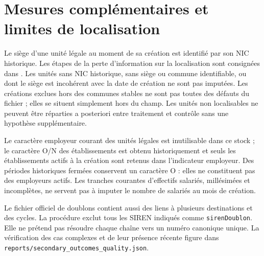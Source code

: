 \section{Mesures complémentaires et limites de localisation}
Le siège d’une unité légale au moment de sa création est identifié par son NIC historique. Les étapes de la perte d’information sur la localisation sont consignées dans . Les unités sans NIC historique, sans siège ou commune identifiable, ou dont le siège est incohérent avec la date de création ne sont pas imputées. Les créations exclues hors des communes stables ne sont pas toutes des défauts du fichier ; elles se situent simplement hors du champ. Les unités non localisables ne peuvent être réparties a posteriori entre traitement et contrôle sans une hypothèse supplémentaire.

Le caractère employeur courant des unités légales est inutilisable dans ce stock ; le caractère O/N des établissements est obtenu historiquement et seuls les établissements actifs à la création sont retenus dans l’indicateur employeur. Des périodes historiques fermées conservent un caractère O : elles ne constituent pas des employeurs actifs. Les tranches courantes d’effectifs salariés, millésimées et incomplètes, ne servent pas à imputer le nombre de salariés au mois de création.

Le fichier officiel de doublons contient aussi des liens à plusieurs destinations et des cycles. La procédure exclut tous les SIREN indiqués comme \texttt{sirenDoublon}. Elle ne prétend pas résoudre chaque chaîne vers un numéro canonique unique. La vérification des cas complexes et de leur présence récente figure dans \texttt{reports/secondary\_outcomes\_quality.json}.

\begin{table}[htbp]\centering\small\caption{Résultats administratifs supplémentaires : comparaisons frontalières}\end{table}

